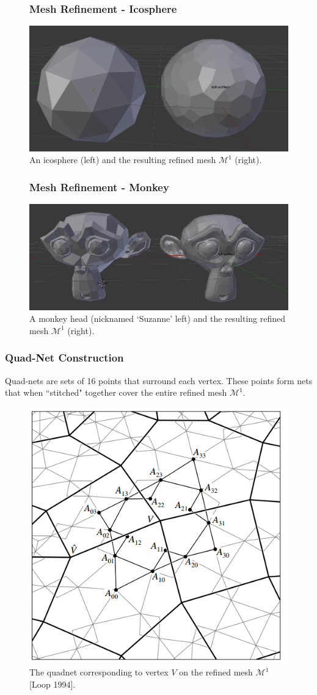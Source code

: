 \documentclass[11pt]{beamer}
\begin{document}
	\begin{frame}
		\begin{figure}
			\frametitle{Mesh Refinement - Icosphere}
			\centering
			\includegraphics[width=.7\linewidth]{img/refine_icosphere}
			\caption{An icosphere (left) and the resulting refined mesh $\mathcal{M}^1$ (right).}		
		\end{figure}
	\end{frame}

	\begin{frame}
		\begin{figure}
			\frametitle{Mesh Refinement - Monkey}
			\centering
			\includegraphics[width=.7\linewidth]{img/refine_monkey}
			\caption{A monkey head (nicknamed `Suzanne' left) and the resulting refined mesh $\mathcal{M}^1$ (right).}			
		\end{figure}
	\end{frame}

	\begin{frame}
		\frametitle{Quad-Net Construction}
		Quad-nets are sets of 16 points that surround each vertex. These points form nets that when ``stitched" together cover the entire refined mesh $\mathcal{M}^1$. 
	
		\begin{figure}[bp!]
			\centering			
			\includegraphics[width=.5\linewidth]{img/loop_quad_net}
			\caption{The quadnet corresponding to vertex $V$ on the refined mesh $\mathcal{M}^1$ [Loop 1994].}			
		\end{figure} 	
	\end{frame}
\end{document}
